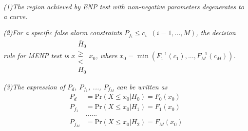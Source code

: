 \textit{(1)The region achieved by ENP test with non-negative parameters degenerates to a curve.}

\textit{(2)For a specific false alarm constraints $P_{f_i} \leq c_i\;\;(i = 1, ..., M)$, the decision rule for MENP test is $x \substack{\bar{H}_0 \\ \geq \\ < \\H_0} x_0$, where $x_0 = \min(F_1^{-1}(c_1), ..., F_M^{-1}(c_M))$.}

\textit{(3)The expression of $P_d$, $P_{f_1}$, ..., $P_{f_M}$ can be written as}
\begin{equation}
\label{equ: chi pd}
  \begin{split}
    P_d &= \text{Pr}(X \leq x_0 | H_0) = F_0(x_0)\\
        P_{f_1} &= \text{Pr}(X \leq x_0 | H_1) = F_1(x_0)\\
        &......\\
            P_{f_M} &= \text{Pr}(X \leq x_0 | H_2) = F_M(x_0)
  \end{split}
\end{equation}

